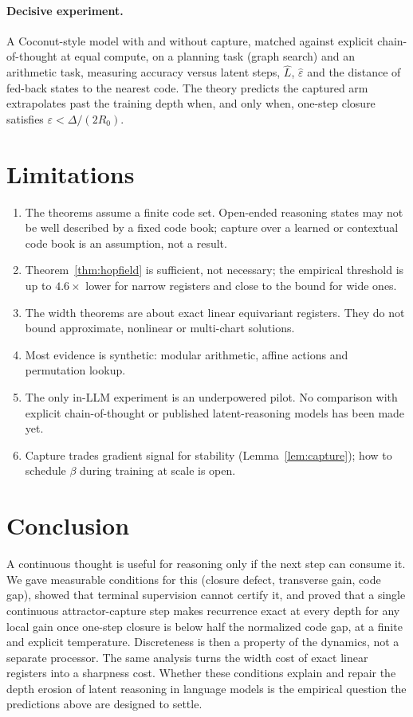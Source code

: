 \documentclass[11pt]{article}
\theoremstyle{definition}
\theoremstyle{remark}
\begin{document}
\paragraph{Decisive experiment.} A Coconut-style model with and without capture, matched against
explicit chain-of-thought at equal compute, on a planning task (graph search) and an arithmetic
task, measuring accuracy versus latent steps, $\hat L$, $\hat\varepsilon$ and the distance of fed-back
states to the nearest code. The theory predicts the captured arm extrapolates past the training
depth when, and only when, one-step closure satisfies $\varepsilon<\Delta/(2R_0)$.

\section{Limitations}

\begin{enumerate}[leftmargin=*,itemsep=2pt]
\item The theorems assume a finite code set. Open-ended reasoning states may not be well
described by a fixed code book; capture over a learned or contextual code book is an assumption,
not a result.
\item Theorem~\ref{thm:hopfield} is sufficient, not necessary; the empirical threshold is up to
$4.6\times$ lower for narrow registers and close to the bound for wide ones.
\item The width theorems are about exact linear equivariant registers. They do not bound
approximate, nonlinear or multi-chart solutions.
\item Most evidence is synthetic: modular arithmetic, affine actions and permutation lookup.
\item The only in-LLM experiment is an underpowered pilot. No comparison with explicit
chain-of-thought or published latent-reasoning models has been made yet.
\item Capture trades gradient signal for stability (Lemma~\ref{lem:capture}); how to schedule
$\beta$ during training at scale is open.
\end{enumerate}

\section{Conclusion}

A continuous thought is useful for reasoning only if the next step can consume it. We gave
measurable conditions for this (closure defect, transverse gain, code gap), showed that terminal
supervision cannot certify it, and proved that a single continuous attractor-capture step makes
recurrence exact at every depth for any local gain once one-step closure is below half the
normalized code gap, at a finite and explicit temperature. Discreteness is then a property of
the dynamics, not a separate processor. The same analysis turns the width cost of exact linear
registers into a sharpness cost. Whether these conditions explain and repair the depth erosion of
latent reasoning in language models is the empirical question the predictions above are designed
to settle.
\end{document}
